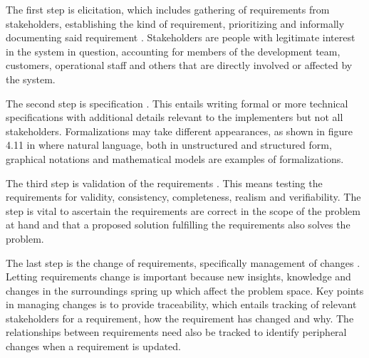 The first step is elicitation, which includes gathering of
requirements from stakeholders, establishing the kind of
requirement, prioritizing and informally documenting said requirement \cite[112-120]{sommerville-software-engineering}.
Stakeholders \cite[103-104]{sommerville-software-engineering} are
people with legitimate interest in the system in question,
accounting for members of the development team, customers,
operational staff and others that are directly involved or affected
by the system. 

The second step is specification \cite[120-129]{sommerville-software-engineering}.
This entails writing formal or more technical specifications with
additional details relevant to the implementers but not all
stakeholders. Formalizations may take different appearances, as
shown in figure 4.11 in \cite[121]{sommerville-software-engineering}
where natural language, both in unstructured and structured form,
graphical notations and mathematical models are examples of
formalizations.

The third step is validation of the requirements \cite[129-130]{sommerville-software-engineering}.
This means testing the requirements for validity, consistency,
completeness, realism and verifiability. The step is vital to
ascertain the requirements are correct in the scope of the problem
at hand and that a proposed solution fulfilling the requirements also
solves the problem.

The last step is the change of requirements, specifically management of
changes \cite[130-134]{sommerville-software-engineering}. Letting
requirements change is important because new insights, knowledge and
changes in the surroundings spring up which affect the problem space.
Key points in managing changes is to provide traceability, which
entails tracking of relevant stakeholders for a requirement, how the
requirement has changed and why. The relationships between
requirements need also be tracked to identify peripheral changes when
a requirement is updated.
